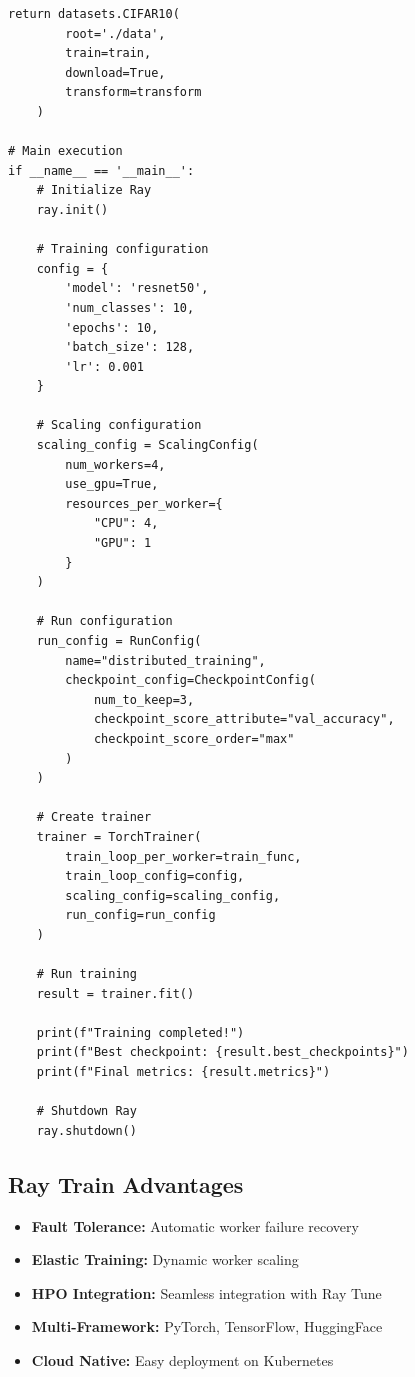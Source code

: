 \begin{lstlisting}[style=python, caption=Distributed Training with Ray Train]
    return datasets.CIFAR10(
        root='./data',
        train=train,
        download=True,
        transform=transform
    )

# Main execution
if __name__ == '__main__':
    # Initialize Ray
    ray.init()

    # Training configuration
    config = {
        'model': 'resnet50',
        'num_classes': 10,
        'epochs': 10,
        'batch_size': 128,
        'lr': 0.001
    }

    # Scaling configuration
    scaling_config = ScalingConfig(
        num_workers=4,
        use_gpu=True,
        resources_per_worker={
            "CPU": 4,
            "GPU": 1
        }
    )

    # Run configuration
    run_config = RunConfig(
        name="distributed_training",
        checkpoint_config=CheckpointConfig(
            num_to_keep=3,
            checkpoint_score_attribute="val_accuracy",
            checkpoint_score_order="max"
        )
    )

    # Create trainer
    trainer = TorchTrainer(
        train_loop_per_worker=train_func,
        train_loop_config=config,
        scaling_config=scaling_config,
        run_config=run_config
    )

    # Run training
    result = trainer.fit()

    print(f"Training completed!")
    print(f"Best checkpoint: {result.best_checkpoints}")
    print(f"Final metrics: {result.metrics}")

    # Shutdown Ray
    ray.shutdown()
\end{lstlisting}

\subsection{Ray Train Advantages}

\begin{itemize}
    \item \textbf{Fault Tolerance:} Automatic worker failure recovery
    \item \textbf{Elastic Training:} Dynamic worker scaling
    \item \textbf{HPO Integration:} Seamless integration with Ray Tune
    \item \textbf{Multi-Framework:} PyTorch, TensorFlow, HuggingFace
    \item \textbf{Cloud Native:} Easy deployment on Kubernetes
\end{itemize}

